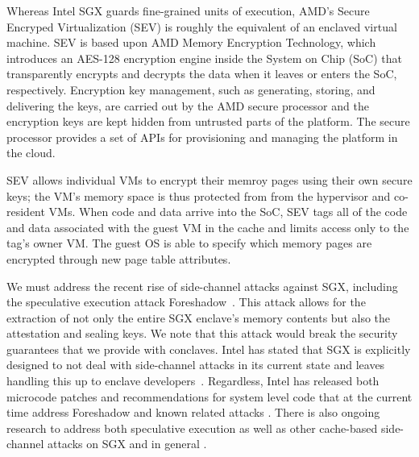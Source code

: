 %
Whereas Intel SGX guards fine-grained units of execution, AMD's Secure
Encryped Virtualization (SEV) is roughly the equivalent of an enclaved
virtual machine.
%
SEV is based upon AMD Memory Encryption Technology, which introduces an
AES-128 encryption engine inside the System on Chip (SoC) that transparently
encrypts and decrypts the data when it leaves or enters the SoC, respectively.
%
Encryption key management, such as generating, storing, and delivering the
keys, are carried out by the AMD secure processor and the encryption keys are kept
hidden from untrusted parts of the platform.
%
The secure processor provides a set of APIs for provisioning and managing the
platform in the cloud.


SEV allows individual VMs to encrypt their memroy pages using their own secure
keys; the VM's memory space is thus protected from from the hypervisor and
co-resident VMs.
%
When code and data arrive into the SoC, SEV tags all of the code and data
associated with the guest VM in the cache and limits access only to the tag's
owner VM.
%
The guest OS is able to specify which memory pages are encrypted through new
page table attributes.



%
We must address the recent rise of side-channel attacks against SGX, including
the speculative execution attack Foreshadow~\cite{foreshadow,
weisse2018foreshadow}.  
%
This attack allows for the extraction of not only the entire SGX enclave's
memory contents but also the attestation and sealing keys.  
%
We note that this attack would break the security guarantees that we provide
with conclaves.
%
Intel has stated that SGX is explicitly designed to not deal with side-channel
attacks in its current state and leaves handling this up to enclave
developers~\cite{sgx-sidechannel, sgx-developers}.
%
Regardless, Intel has released both microcode patches and recommendations for
system level code that at the current time address Foreshadow and known related
attacks \cite{sgx-patch, canella2018systematic, weisse2018foreshadow}.  
%
There is also ongoing research to address both speculative execution as well as
other cache-based side-channel attacks on SGX and in general
\cite{yan2018invisispec, oleksenko2018varys, canella2018systematic, shih2017t}.




